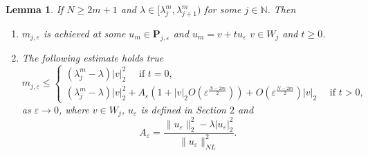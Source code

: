 \documentclass[reqno]{amsart}
\newtheorem{lemma}[theorem]{Lemma}
\newcommand{\la} {\lambda}
\newcommand{\eps}{\varepsilon}
\newcommand{\mb} {\mathbb}
\numberwithin{theorem}{section} \numberwithin{equation}{section}
\begin{document}
\begin{lemma}%
If $N \geq 2m+1$ and $\la \in[\la^m_j, \la^m_{j+1})$ for some $j \in \mb{N}$. Then
\begin{enumerate}
\item $m_{j,\eps}$ is achieved at some $u_m \in \mathbf{P}_{j, \eps}$ and $u_m=v+t u_\eps$ $v \in {W}_j$ and $t \geq 0$.
\item The following estimate holds true
\begin{equation}\label{e21}
m_{j,\eps} \leq\left\{\begin{array}{l}
\left(\la^m_j-\la\right)|v|_2^2 \quad \text { if } t=0, \\
\left(\la^m_j-\la\right)|v|_2^2+A_{\eps}\left(1+|v|_2 O\left(\eps^{\frac{N-2m}{2}}\right)\right)+ O\left(\eps^{\frac{N-2m}{2}}\right)|v|_2 \quad \text { if } t>0,
\end{array}\right.
\end{equation}
as $\eps \rightarrow 0$, where  $v \in {W}_j$, $u_{\eps}$ is defined in Section $2$ and
\begin{equation}\label{e22}
A_{\eps}=\frac{\|u_{\eps}\|_2^2-\la|u_{\eps}|_2^2}{\|u_{\eps}\|_{NL}^2}.
\end{equation}\end{enumerate}
\end{lemma}
\end{document}
